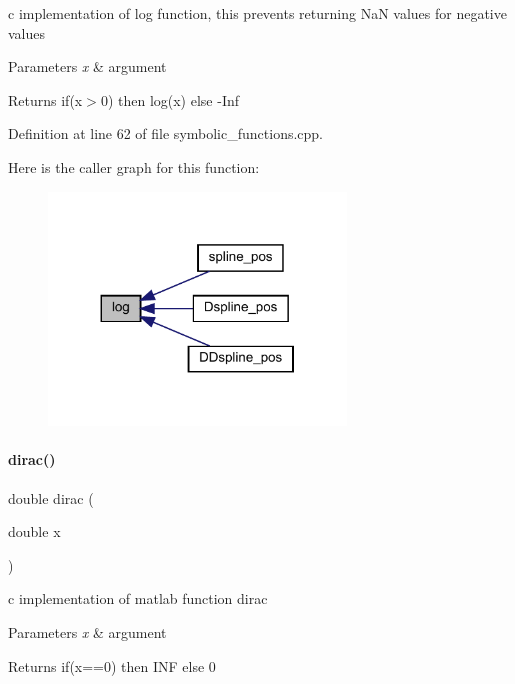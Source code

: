 c implementation of log function, this prevents returning NaN values for negative values


\begin{DoxyParams}{Parameters}
{\em x} & argument \\
\hline
\end{DoxyParams}
\begin{DoxyReturn}{Returns}
if(x$>$0) then log(x) else -\/\+Inf 
\end{DoxyReturn}


Definition at line 62 of file symbolic\+\_\+functions.\+cpp.

Here is the caller graph for this function\+:
\nopagebreak
\begin{figure}[H]
\begin{center}
\leavevmode
\includegraphics[width=224pt]{namespaceamici_adb302c9aafbaa5e180d9f60ee954bb82_icgraph}
\end{center}
\end{figure}
\mbox{\label{namespaceamici_a30a33546875b9dd1a63c29312b316f7e}} 
\paragraph{\texorpdfstring{dirac()}{dirac()}}
{\footnotesize\ttfamily double dirac (\begin{DoxyParamCaption}\item[{double}]{x }\end{DoxyParamCaption})}

c implementation of matlab function dirac


\begin{DoxyParams}{Parameters}
{\em x} & argument \\
\hline
\end{DoxyParams}
\begin{DoxyReturn}{Returns}
if(x==0) then I\+NF else 0 
\end{DoxyReturn}


